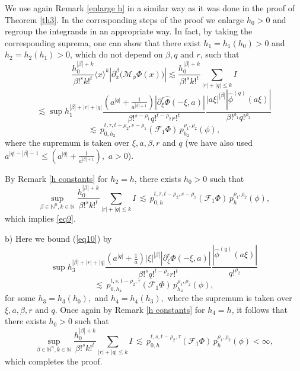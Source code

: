 \documentclass[reqno,12pt]{amsart}
\theoremstyle{plain}
\theoremstyle{definition}
\theoremstyle{remark}
\begin{document}
\par

We use again Remark \ref{enlarge h}
in a similar way as it was done in the proof of Theorem \ref{th3}.
In the corresponding steps of the proof we enlarge $h_0 > 0 $ and
regroup the integrands in an appropriate way. In fact, by taking the
corresponding suprema, one can show that there exist $h_1 = h_1 (h_0)
>0$ and $h_2 = h_2 (h_1) >0$, which do not depend on $\beta, q$ and $r$,
such that
\begin{equation} \label{eq10}
\frac{h_0 ^{|\beta| + k}}{\beta!^{s} k!^{t}}
\langle x \rangle^{k} |\partial_x^{\beta} \big({\mathcal M}_{\phi}
\Phi (x)\big)| \lesssim
\frac{h_0 ^{|\beta| + k}}{\beta!^{s} k!^{t}} \sum_{|r| + |q|
\leq k} I
\end{equation}
$$
\lesssim \sup  h_1 ^{|\beta| + |r| + |q|} \frac{\left ( a^{|q|} +
\frac{1}{a^{|\beta| +1}} \right) |\partial_{\xi}^r \hat{\Phi} (-\xi,
a)|}{\beta!^{s -\rho_1} q!^{t - \rho_2} r!^{t}}
\frac{|a\xi|^{|\beta|} |\hat{\phi}^{(q)} (a \xi)|}{\beta!^{\rho_1}
q!^{ \rho_2}}
$$
$$
\lesssim \, p^{t, \tau, t - \rho_2, s - \rho_1}_{0, h_2}
({\mathcal F}_1 \Phi) \, p^{\rho_1, \rho_2}_{h_2} (\phi),
$$
where the supremum is taken over $ \xi, a, \beta, r$ and $q$ (we
have also used $ a^{|q|-|\beta|-1} \leq \left ( a^{|q|} +
\frac{1}{a^{|\beta| +1}} \right),$ $a>0$).

By Remark \ref{h constants} for $h_2 = h$, there exists $h_0 > 0 $
such that
$$
\sup_{\beta \in  \mathbb{N}^n, k \in  \mathbb{N}} \frac{h_0
^{|\beta| + k}}{\beta!^{s} k!^{t}}
 \sum_{|r| + |q| \leq k} I \, \lesssim \,
p^{t, \tau, t - \rho_2, s - \rho_1}_{0, h} ({\mathcal F}_1
\Phi) \, p^{\rho_1, \rho_2}_{h} (\phi) ,
$$
which implies \eqref{eq9}.

\par

b) Here we bound (\ref{eq10}) by
$$
\sup  h_3 ^{|\beta| + |r| + |q|} \frac{\left ( a^{|q|} + \frac{1}{a}
\right) |\xi|^{|\beta|} |\partial_{\xi}^r \hat{\Phi} (-\xi,
a)|}{\beta!^{s} q!^{t - \rho_2} r!^{t}}
\frac{|\hat{\phi}^{(q)} (a\xi)|}{ q!^{ \rho_2}}
$$
$$
\lesssim \, p^{t, s, t - \rho_2, \tau}_{0, h_4} ({\mathcal
F}_1 \Phi) \, p^{\rho_1, \rho_2}_{ h_4} (\phi),
$$
for some $ h_3 = h_3 (h_0),$ and $ h_4 = h_4 (h_3),$ where the
supremum is taken over $ \xi, a, \beta, r$ and $q$. Once again by Remark
\ref{h constants} for $h_4 = h$, it follows that there exists $h_0 > 0
$ such that
$$
\sup_{\beta \in  \mathbb{N}^n, k \in  \mathbb{N}} \frac{h_0
^{|\beta| + k}}{\beta!^{s} k!^{t}} \sum_{|r| + |q| \leq k}  I \,
\lesssim \, p^{t, s, t - \rho_2, \tau}_{0, h} ({\mathcal
F}_1 \Phi) \, p^{\rho_1, \rho_2}_{ h} (\phi) < \infty,
$$
which completes the proof.
\end{document}
